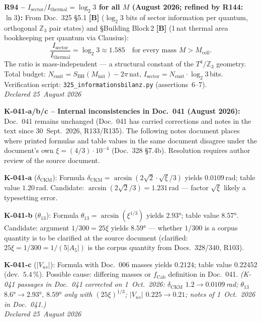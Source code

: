 \textbf{R94 -- $I_\mathrm{sector}/I_\mathrm{thermal} = \log_2 3$ for all $M$ (August 2026; refined by R144: $\ln 3$):}
From Doc.~325 §5.1 \textbf{[B]} ($\log_2 3$ bits of sector information per quantum,
orthogonal $\mathbb{Z}_3$ pair states) and §Building Block\,2 \textbf{[B]}
(1\,nat thermal area bookkeeping per quantum via Clausius):
\begin{equation*}
  \frac{I_\mathrm{sector}}{I_\mathrm{thermal}} = \log_2 3 \approx 1.585
  \quad\text{for every mass $M > M_\mathrm{coll}$.}
\end{equation*}
The ratio is mass-independent --- a structural constant of the
$T^4/\mathbb{Z}_3$ geometry. Total budget:
$N_\mathrm{emit} = S_\mathrm{BH}(M_\mathrm{init}) - 2\pi$\,nat,
$I_\mathrm{sector} = N_\mathrm{emit}\cdot\log_2 3$\,bits.
Verification script: \texttt{325\_informationsbilanz.py} (assertions~6--7).\\
\emph{Declared 25~August 2026}

\medskip

\textbf{K-041-a/b/c -- Internal inconsistencies in Doc.~041 (August 2026):}
Doc.~041 remains unchanged (Doc.~041 has carried corrections and notes in the text since 30~Sept.~2026, R133/R135). The following notes document places where
printed formulas and table values in the same document disagree under
the document's own $\xi = (4/3)\cdot10^{-4}$ (Doc.~328 §7.4b).
Resolution requires author review of the source document.

\textbf{K-041-a} ($\delta_\mathrm{CKM}$):
Formula $\delta_\mathrm{CKM} = \arcsin(2\sqrt{2}\cdot\sqrt{\xi}/3)$
yields $0.0109$\,rad; table value $1.20$\,rad.
Candidate: $\arcsin(2\sqrt{2}/3) = 1.231$\,rad --- factor $\sqrt{\xi}$ likely a typesetting error.

\textbf{K-041-b} ($\theta_{13}$):
Formula $\theta_{13} = \arcsin(\xi^{1/3})$ yields $2.93°$; table value $8.57°$.
Candidate: argument $1/300 = 25\xi$ yields $8.59°$ ---
whether $1/300$ is a corpus quantity is to be clarified at the source document (clarified: $25\xi=1/300=1/(5|A_5|)$ is the corpus quantity from Docs.~328/340, R103).

\textbf{K-041-c} ($|V_{us}|$):
Formula with Doc.~006 masses yields $0.2124$; table value $0.22452$ (dev.\ $5.4\,\%$).
Possible cause: differing masses or $f_\mathrm{Cab}$ definition in Doc.~041. \emph{(K-041 passages in Doc.~041 corrected on 1~Oct.~2026: $\delta_\mathrm{CKM}$ $1.2\to0.0109$\,rad; $\theta_{13}$ $8.6°\to2.93°$, $8.59°$ only with $(25\xi)^{1/3}$; $|V_{us}|$ $0.225\to0.21$; notes of 1~Oct.~2026 in Doc.~041.)}\\
\emph{Declared 25~August 2026}

